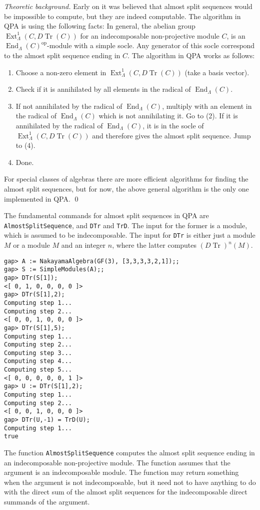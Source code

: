 \documentclass{amsart}
\newcommand{\End}{\operatorname{End}\nolimits}
\newcommand{\Tr}{\operatorname{Tr}\nolimits}
\newcommand{\Ext}{\operatorname{Ext}\nolimits}
\newcommand{\op}{{\operatorname{op}\nolimits}}
\theoremstyle{definition}
\newcommand{\code}[1]{\texttt{#1}}
\theoremstyle{theoretic}
\newenvironment{theoback}
{\medskip\footnotesize\textit{Theoretic background.} }
{\qed\par\medskip}
\begin{document}
\begin{theoback} 
Early on it was believed that almost split sequences would be
impossible to compute, but they are indeed computable.  The algorithm
in QPA is using the following facts:  In general, the abelian group
$\Ext^1_\Lambda(C,D\Tr(C))$ for an indecomposable non-projective
module $C$, is an $\End_\Lambda(C)^\op$-module with a simple socle.
Any generator of this socle correspond to the almost split sequence
ending in $C$.  The algorithm in QPA works as follows:  
\begin{enumerate}[\rm(1)]
\item Choose a non-zero element in $\Ext^1_\Lambda(C,D\Tr(C))$ (take a
  basis vector).
\item Check if it is annihilated by all elements in the radical of
  $\End_\Lambda(C)$. 
\item If not annihilated by the radical of $\End_\Lambda(C)$, multiply
  with an element in the radical of $\End_\Lambda(C)$ which is not
  annihilating it.  Go to (2).  If it is annihilated by the radical of
  $\End_\Lambda(C)$, it is in the socle of $\Ext^1_\Lambda(C,D\Tr(C))$
  and therefore gives the almost split sequence.  Jump to (4).
\item Done.
\end{enumerate}
For special classes of algebras there are more efficient algorithms
for finding the almost split sequences, but for now, the above general
algorithm is the only one implemented in QPA. 
\end{theoback} 

\sloppypar The fundamental commands for almost split sequences in QPA are
\code{AlmostSplitSequence}, and \code{DTr} and \code{TrD}.  The input
for the former is a module, which is assumed to be indecomposable.
The input for \code{DTr} is either just a module $M$ or a module $M$
and an integer $n$, where the latter computes $(D\Tr)^n(M)$.  
\begin{verbatim}
gap> A := NakayamaAlgebra(GF(3), [3,3,3,3,2,1]);;
gap> S := SimpleModules(A);;
gap> DTr(S[1]);
<[ 0, 1, 0, 0, 0, 0 ]>
gap> DTr(S[1],2);
Computing step 1...
Computing step 2...
<[ 0, 0, 1, 0, 0, 0 ]>
gap> DTr(S[1],5);
Computing step 1...
Computing step 2...
Computing step 3...
Computing step 4...
Computing step 5...
<[ 0, 0, 0, 0, 0, 1 ]>
gap> U := DTr(S[1],2);
Computing step 1...
Computing step 2...
<[ 0, 0, 1, 0, 0, 0 ]>
gap> DTr(U,-1) = TrD(U);   
Computing step 1...
true
\end{verbatim}
The function \code{AlmostSplitSequence} computes the almost split
sequence ending in an indecomposable non-projective module.  The 
function assumes that the argument is an indecomposable module.  The
function may return something when the argument is not indecomposable,
but it need not to have anything to do with the direct sum of the almost split
sequences for the indecomposable direct summands of the argument. 
\end{document}
